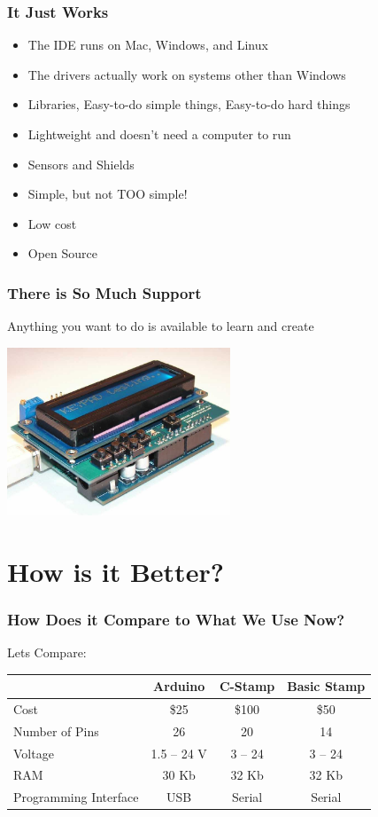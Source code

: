 \documentclass[yellow]{beamer}
\begin{document}
\begin{frame}
\frametitle{It Just Works}
\begin{itemize}
\item<1-> The IDE runs on Mac, Windows, and Linux
\item<2-> The drivers actually work on systems other than Windows
\item<3-> Libraries, Easy-to-do simple things, Easy-to-do hard things
\item<4-> Lightweight and doesn't need a computer to run
\item<5-> Sensors and Shields
\item<6-> Simple, but not TOO simple!
\item<7-> Low cost
\item<8-> Open Source
\end{itemize}
\end{frame}

\begin{frame}
\frametitle{There is So Much Support}
Anything you want to do is available to learn and create
\begin{center}
	\includegraphics[width=0.5\textwidth]{lcd_shield_2.jpg}
\end{center}
\end{frame}

\section{How is it Better?}
\begin{frame}
\frametitle{How Does it Compare to What We Use Now?}
Lets Compare:\\
\begin{center}
\begin{tabular}{ l || c | c | c }
   & Arduino & C-Stamp  & Basic Stamp\\
  \hline
  Cost			& \$25 	& \$100	& \$50 \\
  Number of Pins	& 26 		& 20 		& 14 \\
  Voltage		& 1.5 -- 24 V 	& 3 -- 24 	& 3 -- 24 \\
  RAM			& 30 Kb		& 32 Kb 	& 32 Kb \\
  Programming Interface	& USB		& Serial 	& Serial \\
\end{tabular}
\end{center}
\end{frame}
\end{document}
